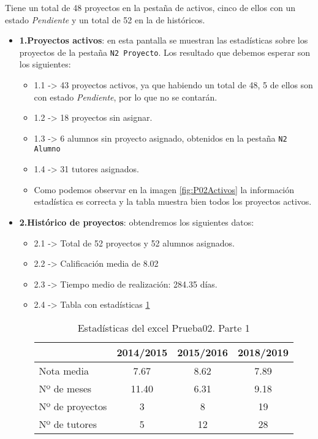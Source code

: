 Tiene un total de 48 proyectos en la pestaña de activos, cinco de ellos con un estado \emph{Pendiente} y un total de 52 en la de históricos.

\begin{itemize}
	\item \textbf{1.Proyectos activos}: en esta pantalla se muestran las estadísticas sobre los proyectos de la pestaña \texttt{N2 Proyecto}. Los resultado que debemos esperar son los siguientes:
	\begin{itemize}
		\item 1.1 -> 43 proyectos activos, ya que habiendo un total de 48, 5 de ellos son con estado \emph{Pendiente}, por lo que no se contarán.
		\item 1.2 -> 18 proyectos sin asignar.
		\item 1.3 -> 6 alumnos sin proyecto asignado, obtenidos en la pestaña \texttt{N2 Alumno}
		\item 1.4 -> 31 tutores asignados.
		
		\item  Como podemos observar en la imagen \ref{fig:P02Activos} la información estadística es correcta y la tabla muestra bien todos los proyectos activos.
	\end{itemize}
	
	\item \textbf{2.Histórico de proyectos}: obtendremos los siguientes datos:
	\begin{itemize}
		\item 2.1 -> Total de 52 proyectos y 52 alumnos asignados.
		\item 2.2 -> Calificación media de 8.02
		\item 2.3 -> Tiempo medio de realización: 284.35 días.		
		\item 2.4 -> Tabla con estadísticas \ref{P02Historico1}
		
		 \begin{table}[]
			\label{P02Historico1}
			\centering
			\begin{tabular}{|l|c|c|c|}
				\hline
				\multicolumn{1}{|c|}{\textbf{}} & \textbf{2014/2015} & \textbf{2015/2016} & \textbf{2018/2019}\\\hline
				Nota media & 7.67 & 8.62  & 7.89 \\ \hline
				Nº de meses & 11.40  & 6.31 & 9.18 \\ \hline
				Nº de proyectos  & 3  & 8 &19 \\ \hline
				Nº de tutores  &  5 &12  & 28  \\ \hline
			\end{tabular}
			\caption{Estadísticas del excel Prueba02. Parte 1}
		\end{table}
	

\end{itemize}
\end{itemize}
